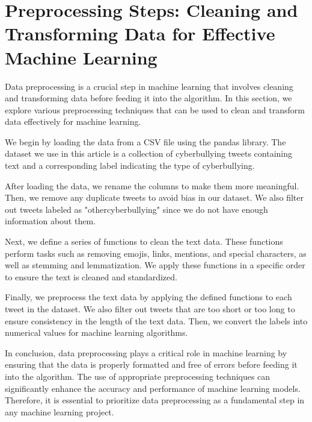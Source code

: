 \documentclass[conference]{IEEEtran}
\begin{document}
\section{Preprocessing Steps: Cleaning and Transforming Data for Effective Machine Learning}

Data preprocessing is a crucial step in machine learning that involves cleaning and transforming data before feeding it into the algorithm. In this section, we explore various preprocessing techniques that can be used to clean and transform data effectively for machine learning.

We begin by loading the data from a CSV file using the pandas library. The dataset we use in this article is a collection of cyberbullying tweets containing text and a corresponding label indicating the type of cyberbullying.

After loading the data, we rename the columns to make them more meaningful. Then, we remove any duplicate tweets to avoid bias in our dataset. We also filter out tweets labeled as "othercyberbullying" since we do not have enough information about them.

Next, we define a series of functions to clean the text data. These functions perform tasks such as removing emojis, links, mentions, and special characters, as well as stemming and lemmatization. We apply these functions in a specific order to ensure the text is cleaned and standardized.

Finally, we preprocess the text data by applying the defined functions to each tweet in the dataset. We also filter out tweets that are too short or too long to ensure consistency in the length of the text data. Then, we convert the labels into numerical values for machine learning algorithms.

In conclusion, data preprocessing plays a critical role in machine learning by ensuring that the data is properly formatted and free of errors before feeding it into the algorithm. The use of appropriate preprocessing techniques can significantly enhance the accuracy and performance of machine learning models. Therefore, it is essential to prioritize data preprocessing as a fundamental step in any machine learning project.
\end{document}
